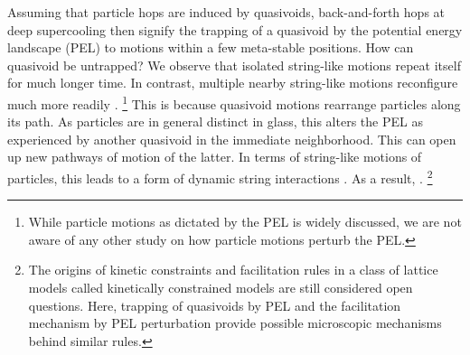 \documentclass[aps,rmp,tighten,twocolumn,floatfix,a4paper,longbibliography]{revtex4-1}
\begin{document}
{
}

{
}



\twocol
{
  Assuming that particle hops are induced by quasivoids, back-and-forth hops at deep supercooling then signify the trapping of a quasivoid by the potential energy landscape (PEL) to motions within a few meta-stable positions. How can quasivoid be untrapped? 
We observe that isolated string-like motions repeat itself for much longer time. In contrast, multiple nearby string-like motions reconfigure much more readily \cite{lam2017,yip2020}.  
  \footnote{While particle motions as dictated by the PEL is widely discussed, we are not aware of any other study on how particle motions perturb the PEL.}
This is because quasivoid motions rearrange particles along its path. As particles are in general distinct in glass, this alters the PEL as experienced by another quasivoid in the immediate neighborhood.
This can open up new pathways of motion of the latter. In terms of string-like motions of particles, this leads to a form of dynamic string interactions \cite{lam2017}.
As a result, .
\footnote{The origins of kinetic constraints and facilitation rules in a class of lattice models called kinetically constrained models are still considered open questions. Here, trapping of quasivoids by PEL and  the facilitation mechanism by PEL perturbation provide possible microscopic mechanisms behind similar rules. }
}{
  \twocol
    {}
    {  }
}
\end{document}
